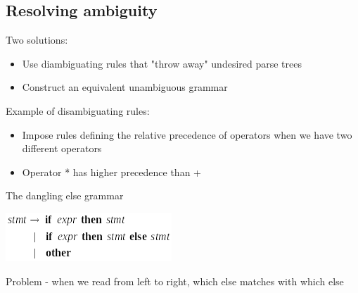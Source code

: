 \documentclass{article}[18pt]
\begin{document}
\subsection{Resolving ambiguity}
Two solutions:
\begin{itemize}
	\item Use diambiguating rules that "throw away" undesired parse trees
	\item Construct an equivalent unambiguous grammar
\end{itemize}
Example of disambiguating rules:
\begin{itemize}
	\item Impose rules defining the relative precedence of operators when we have two different operators
	\item Operator * has higher precedence than +
\end{itemize}
The dangling else grammar
\begin{center}
	\includegraphics[scale=0.7]{"dangling else"}
\end{center}
Problem - when we read from left to right, which else matches with which else
\end{document}
